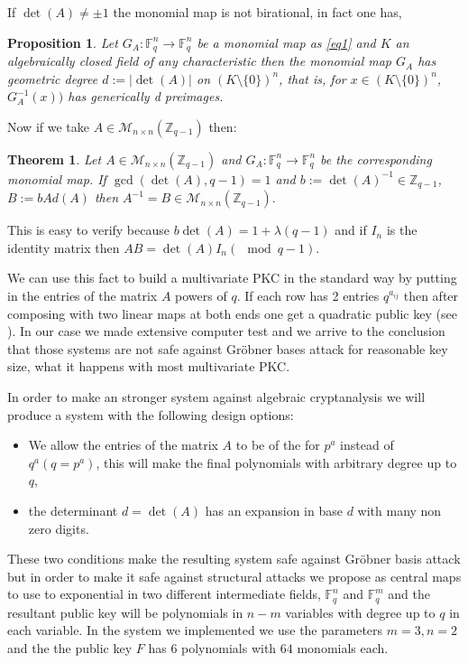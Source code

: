 \documentclass[12pt,a4paper]{amsart}
\newtheorem{thm}{Theorem}[section]
\newtheorem{prop0}{Proposition}
\theoremstyle{remark}
\theoremstyle{definition}
\newcommand\bz{{\mathbb Z}}
\newcommand\gfq{\mathbb{F}_q}
\begin{document}
If $\det(A)\ne \pm 1$ the monomial map is not birational, in fact one has,


\begin{prop0}
 Let $G_A: \gfq^n \to \gfq^n$  be a monomial map as \eqref{eq1} and $K$ an algebraically closed field of any characteristic 
then the monomial map $G_A$ has geometric degree $d:=|\det(A)|$ on $(K\setminus \{0\})^n$,
that is,  for $x\in (K\setminus \{0\})^n$, $G_A^{-1}(x))$  has generically d preimages.
\end{prop0}



Now if we take $A\in \mathscr{M}_{n\times n}(\bz_{q-1})$ then:

\begin{thm}
Let  $A\in \mathscr{M}_{n\times n}(\bz_{q-1})$ and $G_A: \gfq^n \to \gfq^n$  be the corresponding  monomial map.
If $\gcd(\det(A), q-1)=1$ and $b:=\det(A)^{{-1}} \in  \bz_{q-1}$, $B:=b Ad(A)$ then $A^{-1}=B   \in \mathscr{M}_{n\times n}(\bz_{q-1}).$
\end{thm}
This is easy to verify because  $b \det(A)=1+\lambda (q-1) $ and if $I_n$ is the identity matrix then $A B=\det(A)   I_n (\mod   q-1).$




We can use this fact to build a multivariate PKC in the standard way by putting in the entries of the matrix $A$ 
powers of $q$. If each row has 2 entries  $q^{a_{ij}}$  then after composing with two linear maps at both ends one get a quadratic 
public key (see \cite{D}). In our case we made extensive computer test and we arrive to the conclusion that those systems are not safe against 
Gr{\"o}bner bases attack for reasonable key size, what it  happens with most multivariate PKC. 

In order to make an stronger system against algebraic cryptanalysis we will produce a system with the following design options:

\begin{itemize}
 \item  We allow the entries of the matrix $A$ 
to be of the for $p^a$ instead of $q^a (q=p^a)$, 
this will make the final polynomials with arbitrary degree up to $q$,

\item the determinant $d=\det(A)$ has an expansion in base $d$  with many non zero digits.
\end{itemize}


These two conditions make the resulting system safe against Gr{\"o}bner basis attack but in order to make it safe against structural attacks  we propose as central maps to use to exponential in two different intermediate fields, $\gfq^n$ and $\gfq^m$ 
and the resultant public key will be polynomials in $n-m$ variables with degree up to $q$ in each variable. 
In the system we implemented we use the parameters $m=3, n=2$ and the the public key $F$ has $6$ polynomials with $64$ 
monomials each. 
\end{document}
